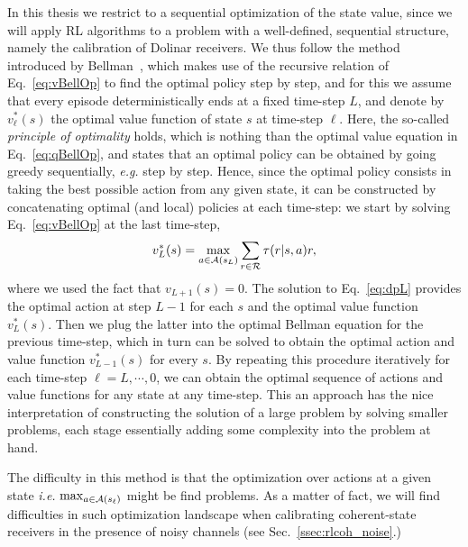 In this thesis we restrict to a sequential optimization of the state value, since we will apply RL algorithms to a problem with a well-defined,  sequential structure, namely the calibration of Dolinar receivers. We thus follow the method introduced by Bellman~\cite{Bellman2003}, which makes use of the recursive relation of Eq.~\eqref{eq:vBellOp} to find the optimal policy step by step, and for this we assume that every episode deterministically ends at a fixed time-step $L$, and denote by $v^{*}_{\ell}(s)$ the optimal value function of state $s$ at time-step $\ell$. Here, the so-called \textit{principle of optimality} holds, which is nothing than the optimal value equation in Eq.~\ref{eq:qBellOp}, and states that an optimal policy can be obtained by going greedy sequentially, \textit{e.g.} step by step. Hence, since the optimal policy consists in taking the best possible action from any given state, it can be constructed by concatenating optimal (and local) policies at each time-step: we start by solving Eq.~\eqref{eq:vBellOp} at the last time-step,
\begin{equation}\label{eq:dpL}
v^{*}_{L}(s)=\max_{a\in\mathcal{A}(s_{L})}\sum_{r\in\mathcal{R}}\tau(r|s,a)r,
\end{equation}
where we used the fact that $v_{L+1}(s)=0$. The solution to Eq.~\eqref{eq:dpL} provides the optimal action at step $L-1$ for each $s$ and the optimal value function $v^{*}_{L}(s)$.
Then we plug the latter into the optimal Bellman equation for the previous time-step, which in turn can be solved to obtain the optimal action and value function $v^{*}_{L-1}(s)$ for every $s$. By repeating this procedure iteratively for each time-step $\ell=L,\cdots,0$, we can obtain the optimal sequence of actions and value functions for any state at any time-step. This an approach has the nice interpretation of constructing the solution of a large problem by solving smaller problems, each stage essentially adding some complexity into the problem at hand.

The difficulty in this method is that the optimization over actions at a given state \textit{i.e.} $\max_{a\in\mathcal{A}(s_{\ell})}$ might be find problems. As a matter of fact, we will find difficulties in such optimization landscape when calibrating coherent-state receivers in the presence of noisy channels (see Sec.~\ref{ssec:rlcoh_noise}.)
